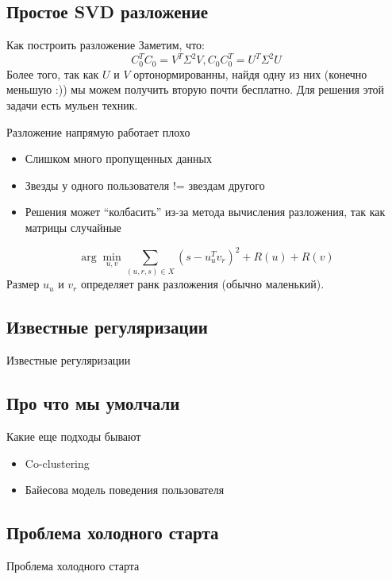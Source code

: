 \documentclass[14pt, fleqn, xcolor={dvipsnames, table}]{beamer}
\begin{document}
\subsection{Простое SVD разложение}  %
\begin{frame}{Как построить разложение}
Заметим, что:
$$
C_0^T C_0 = V^T \Sigma^2 V, C_0 C_0^T = U^T \Sigma^2 U
$$
Более того, так как $U$ и $V$ ортонормированны, найдя одну из них (конечно меньшую :)) мы можем получить вторую почти бесплатно. Для решения этой задачи есть мульен техник.
\end{frame}

\begin{frame}{Разложение напрямую работает плохо}
\begin{itemize}
  \item Слишком много пропущенных данных
  \item Звезды у одного пользователя != звездам другого
  \item Решения может ``колбасить'' из-за метода вычисления разложения, так как матрицы случайные
\end{itemize}
$$
\arg \min_{u,v} \sum_{(u,r,s) \in X} (s - u_u^T v_r)^2 + R(u) + R(v)
$$
Размер $u_u$ и $v_r$ определяет ранк разложения (обычно маленький).
\end{frame}

\subsection{Известные регуляризации} %
\begin{frame}{Известные регуляризации}
\end{frame}

\subsection{Про что мы умолчали}
\begin{frame}{Какие еще подходы бывают}
\begin{itemize}
  \item Co-clustering
  \item Байесова модель поведения пользователя
\end{itemize}
\end{frame}

\subsection{Проблема холодного старта}
\begin{frame}{Проблема холодного старта}
\end{frame}
\end{document}
